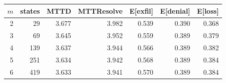 \begin{tabular}{@{}rrrrrrr@{}}
\toprule
$m$ & states & MTTD & MTTResolve & E[exfil] & E[denial] & E[loss]\\
\midrule
2 & 29 & 3.677 & 3.982 & 0.539 & 0.390 & 0.368\\
3 & 69 & 3.645 & 3.952 & 0.559 & 0.389 & 0.379\\
4 & 139 & 3.637 & 3.944 & 0.566 & 0.389 & 0.382\\
5 & 251 & 3.634 & 3.942 & 0.568 & 0.389 & 0.384\\
6 & 419 & 3.633 & 3.941 & 0.570 & 0.389 & 0.384\\
\bottomrule
\end{tabular}
